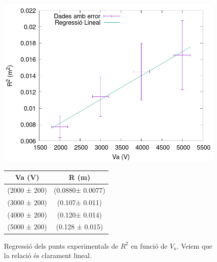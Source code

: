 \documentclass[11pt]{article}
\begin{document}
\begin{figure}[h]
    \centering
    \begin{minipage}{0.45\textwidth}
        \centering
        \includegraphics[width=\textwidth]{RvsVa.png}
        \caption{Regressió dels punts experimentals de $R^2$ en funció de $V_a$. Veiem que la relació és clarament lineal.}
        \label{fig: RvsVa}
    \end{minipage}
    \hfill
    \begin{minipage}{0.45\textwidth} 
        \centering
        \begin{tabular}{|c|c|}
            \hline
            Va (V)	&	R (m)	\\\hline
            (2000 ± 200)	&	(0.0880± 0.0077)	\\\hline
            (3000 ± 200)	&	(0.107± 0.011)	\\\hline
            (4000 ± 200)	&	(0.120± 0.014)	\\\hline
            (5000 ± 200)	&	(0.128 ± 0.015)	\\\hline
            
        \end{tabular}
        \label{tab:RvsVa}
    \end{minipage}
\end{figure}
\end{document}
